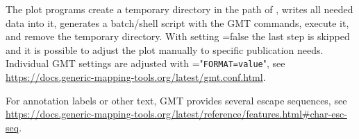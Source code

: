 The plot programs create a temporary directory in the path of , writes all needed data into it,
generates a batch/shell script with the GMT commands, execute it, and remove the temporary directory.
With setting =false the last step is skipped and it is possible to adjust the plot manually
to specific publication needs. Individual GMT settings are adjusted with ="\verb|FORMAT=value|",
see \url{https://docs.generic-mapping-tools.org/latest/gmt.conf.html}.

For annotation labels or other text, GMT provides several escape sequences, see
\url{https://docs.generic-mapping-tools.org/latest/reference/features.html#char-esc-seq}.



